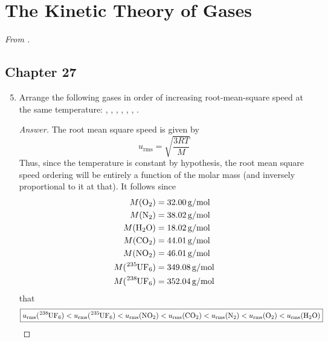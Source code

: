 \documentclass[../psets.tex]{subfiles}
\begin{document}
\section{The Kinetic Theory of Gases}
\emph{From \textcite{bib:McQuarrieSimon}.}
\subsection*{Chapter 27}
\begin{enumerate}[label={\textbf{27-\arabic*.}},leftmargin=3.5em]
    \setcounter{enumi}{4}
    \item Arrange the following gases in order of increasing root-mean-square speed at the same temperature: , , , , , , .
    \begin{proof}[Answer]
        The root mean square speed is given by
        \begin{equation*}
            u_\text{rms} = \sqrt{\frac{3RT}{M}}
        \end{equation*}
        Thus, since the temperature is constant by hypothesis, the root mean square speed ordering will be entirely a function of the molar mass (and inversely proportional to it at that). It follows since
        \begin{align*}
            M(\ce{O2})        &= \SI[per-mode=symbol]{32.00}{\gram\per\mole}\\
            M(\ce{N2})        &= \SI[per-mode=symbol]{38.02}{\gram\per\mole}\\
            M(\ce{H2O})       &= \SI[per-mode=symbol]{18.02}{\gram\per\mole}\\
            M(\ce{CO2})       &= \SI[per-mode=symbol]{44.01}{\gram\per\mole}\\
            M(\ce{NO2})       &= \SI[per-mode=symbol]{46.01}{\gram\per\mole}\\
            M(\ce{{}^235UF6}) &= \SI[per-mode=symbol]{349.08}{\gram\per\mole}\\
            M(\ce{{}^238UF6}) &= \SI[per-mode=symbol]{352.04}{\gram\per\mole}
        \end{align*}
        that
        \begin{equation*}
            \boxed{
                u_\text{rms}(\ce{{}^238UF6}) < u_\text{rms}(\ce{{}^235UF6})
                < u_\text{rms}(\ce{NO2})
                < u_\text{rms}(\ce{CO2})
                < u_\text{rms}(\ce{N2})
                < u_\text{rms}(\ce{O2})
                < u_\text{rms}(\ce{H2O})
            }
        \end{equation*}

\end{proof}
\end{enumerate}
\end{document}

